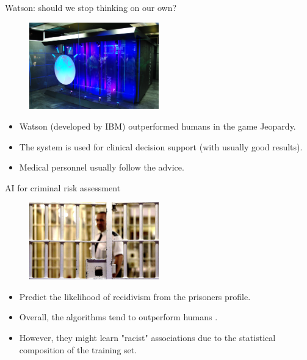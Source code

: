 \documentclass[xcolor=pdftex,dvipsnames,table]{beamer}
\begin{document}
\begin{frame}{Watson: should we stop thinking on our own?}
\begin{figure}[htb]
\includegraphics[width=0.5\textwidth]{../graphics/watson.pdf}
\end{figure}
\begin{itemize}
\item<1-> Watson (developed by IBM) outperformed humans in the game Jeopardy. 
\item<2-> The system is used for clinical decision support (with usually good results).  
\item<3-> Medical personnel usually follow the advice. 
\end{itemize}
\end{frame}

\begin{frame}{AI for criminal risk assessment}
\begin{figure}[htb]
\includegraphics[width=0.5\textwidth]{../graphics/jail.jpg}
\end{figure}
\begin{itemize}
\item<1-> Predict the likelihood of recidivism from the prisoners profile.
\item<2-> Overall, the algorithms tend to outperform humans \cite{Lin2020}. 
\item<3-> However, they might learn "racist" associations due to the statistical composition of the training set. 
\end{itemize}
\end{frame}



\end{document}
